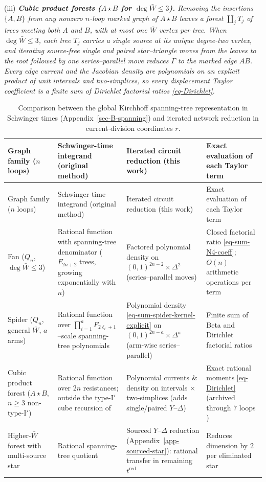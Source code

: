 \documentclass[11pt]{article}
\numberwithin{equation}{section}
\numberwithin{figure}{section}
\numberwithin{table}{section}
\begin{document}
(iii) \emph{\textbf{Cubic product forests ($A\star B$ for $\deg\bar W\le3$).} Removing the insertions $\{A,B\}$ from any nonzero $n$-loop marked graph of $A\star B$ leaves a forest $\coprod_j T_j$ of trees meeting both $A$ and $B$, with at most one $\bar W$ vertex per tree. When $\deg\bar W\le3$, each tree $T_j$ carries a single source at its unique degree-two vertex, and iterating source-free single and paired star--triangle moves from the leaves to the root followed by one series--parallel move reduces $\Gamma$ to the marked edge $AB$. Every edge current and the Jacobian density are polynomials on an explicit product of unit intervals and two-simplices, so every displacement Taylor coefficient is a finite sum of Dirichlet factorial ratios \eqref{eq-Dirichlet}.}

{\small\renewcommand{\arraystretch}{1.25}\setlength{\tabcolsep}{4.5pt}
\begin{xltabular}{\linewidth}{|>{\raggedright\arraybackslash}p{3.0cm}|>{\raggedright\arraybackslash}X|>{\raggedright\arraybackslash}X|>{\raggedright\arraybackslash}p{3.1cm}|}
\caption{Comparison between the global Kirchhoff spanning-tree representation in Schwinger times \cite{Wang} (Appendix~\ref{sec-B-spanning}) and iterated network reduction in current-division coordinates $r$.}\label{tab-sum-complexity}\\
\hline
Graph family ($n$ loops) & Schwinger-time integrand (original method) & Iterated circuit reduction (this work) & Exact evaluation of each Taylor term\\
\hline\endfirsthead
\hline
Graph family ($n$ loops) & Schwinger-time integrand (original method) & Iterated circuit reduction (this work) & Exact evaluation of each Taylor term\\
\hline\endhead
Fan ($Q_n$, $\deg\bar W\le3$) & Rational function with spanning-tree denominator ($F_{2n+2}$ trees, growing exponentially with $n$) & Factored polynomial density on $(0,1)^{2n-2}\times\Delta^2$ (series--parallel moves) & Closed factorial ratio \eqref{eq-sum-N4-coeff}; $O(n)$ arithmetic operations per term\\
\hline
Spider ($Q_n$, general $\bar W$, $a$ arms) & Rational function over $\prod_{i=1}^a F_{2\ell_i+1}$--scale spanning-tree polynomials & Polynomial density \eqref{eq-sum-spider-kernel-explicit} on $(0,1)^{2n-a}\times\Delta^a$ (arm-wise series--parallel) & Finite sum of Beta and Dirichlet factorial ratios\\
\hline
Cubic product forest ($A\star B$, $n\ge3$ non-type-I$'$) & Rational function over $2n$ resistances; outside the type-I$'$ cube recursion of \cite{GWW} & Polynomial currents \& density on intervals $\times$ two-simplices (adds single/paired $Y$--$\Delta$) & Exact rational moments \eqref{eq-Dirichlet} (archived through $7$ loops \cite{KernelRepo})\\
\hline
Higher-$\bar W$ forest with multi-source star & Rational spanning-tree quotient & Sourced $Y$--$\Delta$ reduction (Appendix~\ref{app-sourced-star}): rational transfer in remaining $t^{\mathrm{red}}$ & Reduces dimension by $2$ per eliminated star\\
\hline
\end{xltabular}}
\end{document}

